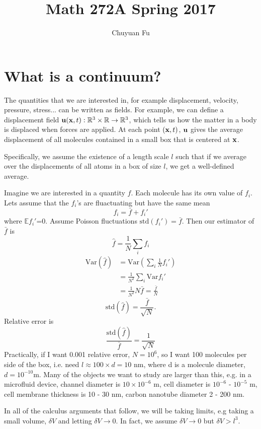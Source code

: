 \documentclass[12pt]{article}
\newcommand{\xx}{{\bf x}}
\newcommand{\uu}{{\bf u}}
\newcommand{\RR}{{\mathbb R}}
\newcommand{\EE}{{\mathbb E}}
\newcommand{\Var}{\text{Var}}
\newcommand{\std}{\text{std}}
\begin{document}
\title{Math 272A Spring 2017}
\author{Chuyuan Fu}
\date{}

\maketitle

\section{What is a continuum?}

The quantities that we are interested in, for example displacement, velocity, pressure, stress... can be written as fields.
For example, we can define a displacement field $\uu(\xx, t) : \RR^3\times \RR \rightarrow \RR^3$, which tells us how the matter in a body is displaced when forces are applied. At each point $(\xx,t)$, $\uu$ gives the average displacement of all molecules contained in a small box that is centered at $\xx$.

Specifically, we assume the existence of a length scale $l$ such that if we average over the displacements of all atoms in a box of size $l$, we get a well-defined average.

Imagine we are interested in a quantity $f$. Each molecule has its own value of $f_i$. Lets assume that the $f_i$'s are fluactuating but have the same mean
\[
f_i = \bar f + f_i'
\]
where $\EE f_i'$=0.
Assume Poisson fluctuations $\std(f_i') = \bar f$.
Then our estimator of $\bar f $ is 
\[
\hat f  = \frac 1 N \sum_i f_i
\]
\begin{align*}
\Var (\hat f)  &=  \Var(\sum_i  \frac 1 N f_i' )\\
		&= \frac {1}{ N^2} \sum_i \Var f_i' \\
		&= \frac {1}{ N^2} N \bar f =\frac{\bar f}{N}
\end{align*}
\[
\std(\hat f ) = \frac{\bar f }{\sqrt{N}}.
\]
Relative error is
\[ 
\frac{\std(\hat f )}{\bar f} = \frac{1}{\sqrt N}
\]
Practically, if I want 0.001 relative error, $N = 10^6$, so I want 100 molecules per side of the box, i.e. need $l \approx 100\times d  = 10$ nm, where d is a molecule diameter, $d = 10^{-10}$m. 
Many of the objects we want to study are larger than this, e.g. in a microfluid device, channel diameter is $10\times 10^{-6} $ m, cell diameter is $10^{-6}$ - $10^{-5}$ m, cell membrane thickness is 10 - 30 nm, carbon nanotube diameter 2 - 200 nm.

In all of the calculus arguments that follow, we will be taking limits, e.g taking a small volume, $\delta V$ and letting $\delta V \rightarrow 0$. In fact, we assume  $\delta V \rightarrow 0$ but $\delta V > l^3$.
\end{document}
